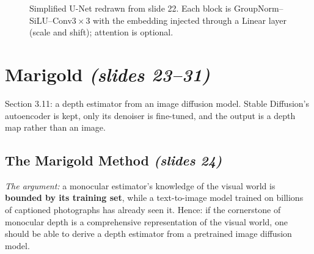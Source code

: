 \documentclass[11pt,a4paper]{article}
\newcommand{\slides}[1]{\texorpdfstring{\emph{(slides #1)}}{(slides #1)}}
\theoremstyle{plain}
\theoremstyle{definition}
\numberwithin{equation}{section}
\begin{document}
\begin{figure}[H]
\centering
{}
\caption{Simplified U-Net redrawn from slide 22. Each block is GroupNorm--SiLU--Conv$3{\times}3$ with the embedding injected through a Linear layer (scale and shift); attention is optional.}
\end{figure}

\section{Marigold \slides{23--31}}\label{sec:marigold}
Section 3.11: a depth estimator from an image diffusion model. Stable Diffusion's autoencoder is kept, only its denoiser is fine-tuned, and the output is a depth map rather than an image.

\subsection{The Marigold Method \slides{24}}
\emph{The argument:} a monocular estimator's knowledge of the visual world is \textbf{bounded by its training set}, while a text-to-image model trained on billions of captioned photographs has already seen it. Hence: if the cornerstone of monocular depth is a comprehensive representation of the visual world, one should be able to derive a depth estimator from a pretrained image diffusion model.
\end{document}
